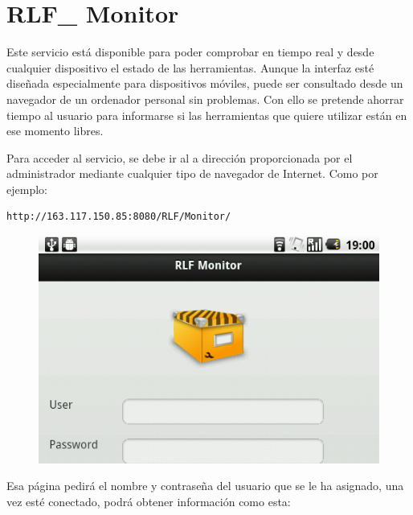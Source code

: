 \clearpage

\section*{RLF\_ Monitor}
Este servicio está disponible para poder comprobar en tiempo real y 
desde cualquier dispositivo el estado de las herramientas. Aunque la 
interfaz esté diseñada especialmente para dispositivos móviles, 
puede ser consultado desde un navegador de un ordenador personal sin 
problemas. Con ello se pretende ahorrar tiempo al usuario para 
informarse si las herramientas que quiere utilizar están en ese 
momento libres.

Para acceder al servicio, se debe ir al a dirección proporcionada por 
el administrador mediante cualquier tipo de navegador de Internet. 
Como por ejemplo:

\begin{verbatim}
http://163.117.150.85:8080/RLF/Monitor/
\end{verbatim}

\begin{figure}[H]
	\centering
	\includegraphics[scale=0.5]{images/user/loginmonitor.png}
\end{figure}

Esa página pedirá el nombre y contraseña del usuario que se le ha 
asignado, una vez esté conectado, podrá obtener información como esta:

